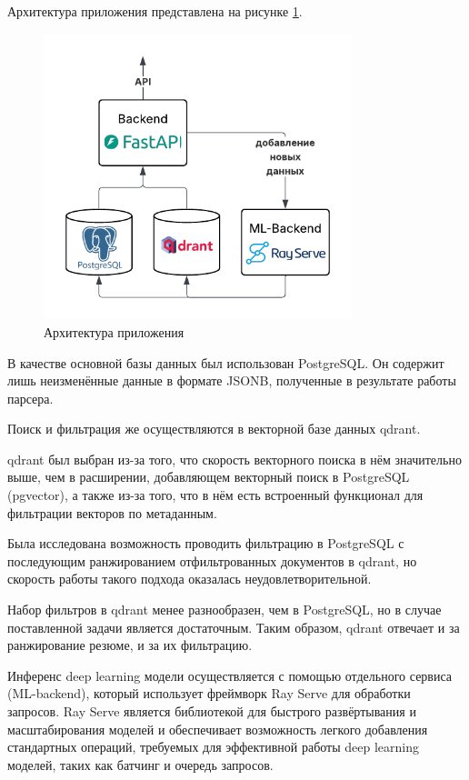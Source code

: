 \documentclass[14pt]{mmcs_article}
\begin{document}
Архитектура приложения представлена на рисунке \ref{fig:system_architecture}.

\begin{figure}[H]
  \centering
  \includegraphics[width=0.8\textwidth]{plots/system_architecture.pdf}
  \caption{Архитектура приложения}
  \label{fig:system_architecture}
\end{figure}

В качестве основной базы данных был использован PostgreSQL. Он содержит лишь неизменённые данные в формате JSONB, полученные в результате работы парсера.

Поиск и фильтрация же осуществляются в векторной базе данных qdrant.

qdrant был выбран из-за того, что скорость векторного поиска в нём значительно выше, чем в расширении, добавляющем векторный поиск в PostgreSQL (pgvector), а также из-за того, что в нём есть встроенный функционал для фильтрации векторов по метаданным.

Была исследована возможность проводить фильтрацию в PostgreSQL с последующим ранжированием отфильтрованных документов в qdrant, но скорость работы такого подхода оказалась неудовлетворительной.

Набор фильтров в qdrant менее разнообразен, чем в PostgreSQL, но в случае поставленной задачи является достаточным. Таким образом, qdrant отвечает и за ранжирование резюме, и за их фильтрацию.

Инференс deep learning модели осуществляется с помощью отдельного сервиса (ML-backend), который использует фреймворк Ray Serve для обработки запросов. Ray Serve является библиотекой для быстрого развёртывания и масштабирования моделей и обеспечивает возможность легкого добавления стандартных операций, требуемых для эффективной работы deep learning моделей, таких как батчинг и очередь запросов.
\end{document}
